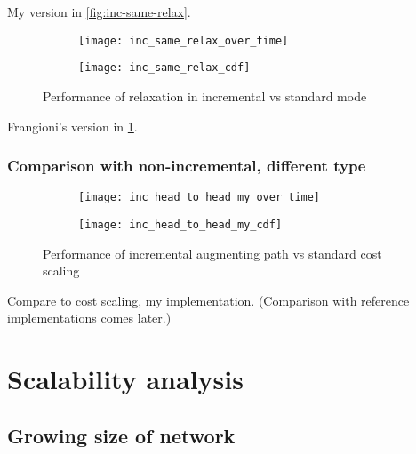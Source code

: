 My version in \cref{fig:inc-same-relax}.

\begin{figure}
    \centering
    \begin{subfigure}[c]{0.45\textwidth}
        \texttt{[image: inc\_same\_relax\_over\_time]}
    \end{subfigure}
    \begin{subfigure}[c]{0.45\textwidth}
        \texttt{[image: inc\_same\_relax\_cdf]}
    \end{subfigure}
    \caption{Performance of relaxation in incremental vs standard mode}
    \label{fig:inc-same-relaxf}
\end{figure}

Frangioni's version in \cref{fig:inc-same-relaxf}. 

\subsubsection{Comparison with non-incremental, different type}

\begin{figure}
    \centering
    \begin{subfigure}[c]{0.45\textwidth}
        \texttt{[image: inc\_head\_to\_head\_my\_over\_time]}
    \end{subfigure}
    \begin{subfigure}[c]{0.45\textwidth}
        \texttt{[image: inc\_head\_to\_head\_my\_cdf]}
    \end{subfigure}
    \caption{Performance of incremental augmenting path vs standard cost scaling}
    \label{fig:inc-head-to-head-my}
\end{figure}

Compare to cost scaling, my implementation. (Comparison with reference implementations comes later.) 

\section{Scalability analysis}

\subsection{Growing size of network}

